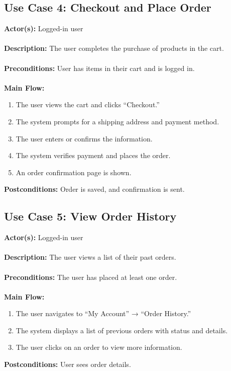 \documentclass[a4paper,12pt]{article}
\begin{document}
	\subsection*{Use Case 4: Checkout and Place Order}
	\textbf{Actor(s):} Logged-in user \\ \\
	\textbf{Description:} The user completes the purchase of products in the cart. \\ \\
	\textbf{Preconditions:} User has items in their cart and is logged in. \\ \\
	\textbf{Main Flow:}
	\begin{enumerate}
  		\item The user views the cart and clicks ``Checkout.''
  		\item The system prompts for a shipping address and payment method.
  		\item The user enters or confirms the information.
  		\item The system verifies payment and places the order.
  		\item An order confirmation page is shown.
	\end{enumerate}
	\textbf{Postconditions:} Order is saved, and confirmation is sent.
	\subsection*{Use Case 5: View Order History}
	\textbf{Actor(s):} Logged-in user \\ \\
	\textbf{Description:} The user views a list of their past orders. \\ \\
	\textbf{Preconditions:} The user has placed at least one order. \\ \\
	\textbf{Main Flow:}
	\begin{enumerate}
  		\item The user navigates to ``My Account'' → ``Order History.''
  		\item The system displays a list of previous orders with status and details.
  		\item The user clicks on an order to view more information.
	\end{enumerate}
	\textbf{Postconditions:} User sees order details.
\end{document}
